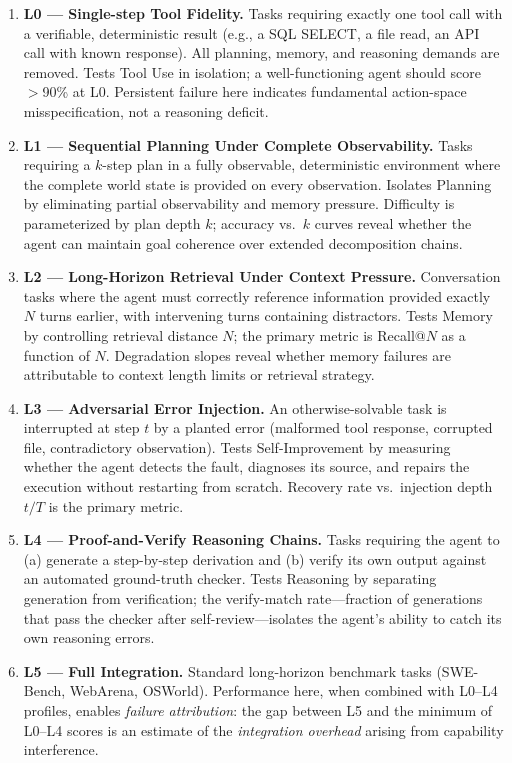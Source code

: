 \begin{enumerate}
    \item \textbf{L0 --- Single-step Tool Fidelity.} Tasks requiring exactly one tool call with a verifiable, deterministic result (e.g., a SQL SELECT, a file read, an API call with known response). All planning, memory, and reasoning demands are removed. Tests Tool Use in isolation; a well-functioning agent should score $>$90\% at L0. Persistent failure here indicates fundamental action-space misspecification, not a reasoning deficit.

    \item \textbf{L1 --- Sequential Planning Under Complete Observability.} Tasks requiring a $k$-step plan in a fully observable, deterministic environment where the complete world state is provided on every observation. Isolates Planning by eliminating partial observability and memory pressure. Difficulty is parameterized by plan depth $k$; accuracy vs.\ $k$ curves reveal whether the agent can maintain goal coherence over extended decomposition chains.

    \item \textbf{L2 --- Long-Horizon Retrieval Under Context Pressure.} Conversation tasks where the agent must correctly reference information provided exactly $N$ turns earlier, with intervening turns containing distractors. Tests Memory by controlling retrieval distance $N$; the primary metric is Recall@$N$ as a function of $N$. Degradation slopes reveal whether memory failures are attributable to context length limits or retrieval strategy.

    \item \textbf{L3 --- Adversarial Error Injection.} An otherwise-solvable task is interrupted at step $t$ by a planted error (malformed tool response, corrupted file, contradictory observation). Tests Self-Improvement by measuring whether the agent detects the fault, diagnoses its source, and repairs the execution without restarting from scratch. Recovery rate vs.\ injection depth $t/T$ is the primary metric.

    \item \textbf{L4 --- Proof-and-Verify Reasoning Chains.} Tasks requiring the agent to (a) generate a step-by-step derivation and (b) verify its own output against an automated ground-truth checker. Tests Reasoning by separating generation from verification; the verify-match rate---fraction of generations that pass the checker after self-review---isolates the agent's ability to catch its own reasoning errors.

    \item \textbf{L5 --- Full Integration.} Standard long-horizon benchmark tasks (SWE-Bench, WebArena, OSWorld). Performance here, when combined with L0--L4 profiles, enables \emph{failure attribution}: the gap between L5 and the minimum of L0--L4 scores is an estimate of the \emph{integration overhead} arising from capability interference.
\end{enumerate}

